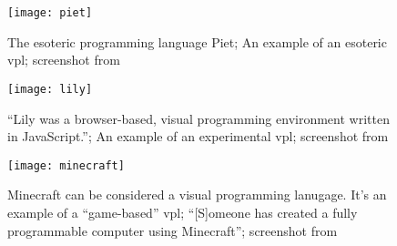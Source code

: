 \begin{figure}[h!]
    \centering \texttt{[image: piet]}
    \caption{
        The esoteric programming language Piet;
        An example of an esoteric \acrshort{vpl};
        screenshot from \protect\cite{fig_piet}
    }
    \label{fig:piet}
\end{figure}

\begin{figure}[h!]
    \centering \texttt{[image: lily]}
    \caption{
        ``Lily was a browser-based, visual programming environment written in JavaScript.''\protect\cite{lily_github};
        An example of an experimental \acrshort{vpl};
        screenshot from \protect\cite{fig_lily}
    }
    \label{fig:lily}
\end{figure}

\begin{figure}[h!]
    \centering \texttt{[image: minecraft]}
    \caption{
        Minecraft\cite{minecraft_site} can be considered a visual programming lanugage.
        It's an example of a ``game-based'' \acrshort{vpl};
        ``[S]omeone has created a fully programmable computer using Minecraft''\cite{snapshots};
        screenshot from \protect\cite{fig_minecraft}
    }
    \label{fig:minecraft}
\end{figure}
